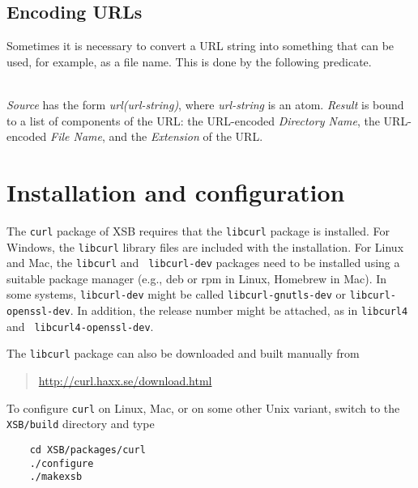 \subsection{Encoding URLs}

Sometimes it is necessary to convert a URL string into something that can
be used, for example, as a file name. This is done by the following
predicate.

\begin{description}
\item[encode\_url({\it +Source, -Result})]\mbox{}
  \\
{\it Source} has the form {\it url(url-string)}, where
\emph{url-string} is an atom.
{\it Result} is bound to a list of components of the URL:
the URL-encoded {\it Directory Name}, the URL-encoded {\it File Name}, and the {\it
  Extension} of the URL.

\end{description}



\section{Installation and configuration}

The {\tt curl} package of XSB requires that the {\tt libcurl} package is
installed.  For Windows, the {\tt libcurl} library files are included with
the installation. For Linux and Mac, the {\tt libcurl} and {\tt
  libcurl-dev} packages need to be installed using a suitable
package manager (e.g., deb or rpm in Linux, Homebrew in Mac). In some
systems, {\tt libcurl-dev} might be
called {\tt libcurl-gnutls-dev} or {\tt libcurl-openssl-dev}.  In addition,
the release number might be attached, as in {\tt libcurl4} and {\tt
  libcurl4-openssl-dev}.

The {\tt libcurl} package can also be downloaded and
built manually from
\begin{quote}
  \url{http://curl.haxx.se/download.html} 
\end{quote}
To configure {\tt curl} on Linux, Mac, or on some other Unix variant,
switch to the {\tt XSB/build} directory and type

\begin{verbatim}
    cd XSB/packages/curl
    ./configure
    ./makexsb
\end{verbatim}

